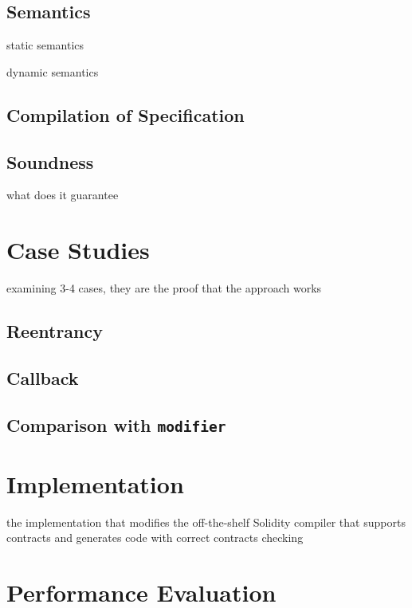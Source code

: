 \documentclass[acmsmall,review,anonymous]{acmart}\settopmatter{printfolios=true,printccs=false,printacmref=false}
\begin{document}
\subsection{Semantics}

static semantics

dynamic semantics

\subsection{Compilation of Specification}

\subsection{Soundness}

what does it guarantee

\section{Case Studies}

examining 3-4 cases, they are the proof that the approach works

\subsection{Reentrancy}

\subsection{Callback}

\subsection{Comparison with \texttt{modifier}}


\section{Implementation}

the implementation that modifies the off-the-shelf Solidity compiler that
supports contracts and generates code with correct contracts checking


\section{Performance Evaluation}
\end{document}
